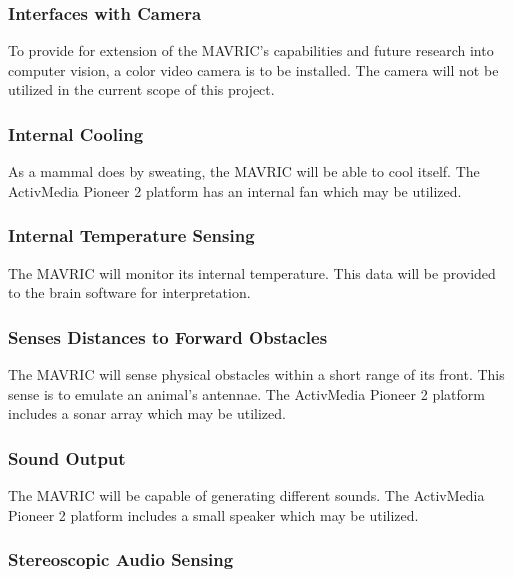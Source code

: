 \documentclass{article}
\begin{document}
        \subsubsection{Interfaces with Camera}
        
            To provide for extension of the MAVRIC's capabilities
            and future research into computer vision,
            a color video camera is to be installed.
            The camera will not be utilized in the current scope of this project.

        \subsubsection{Internal Cooling}
        
            As a mammal does by sweating,
            the MAVRIC will be able to cool itself.
            The ActivMedia Pioneer 2 platform has an internal fan
            which may be utilized.

        \subsubsection{Internal Temperature Sensing}
        
            The MAVRIC will monitor its internal temperature.
            This data will be provided to the brain software
            for interpretation.

        \subsubsection{Senses Distances to Forward Obstacles}
        
            The MAVRIC will sense physical obstacles
            within a short range of its front.
            This sense is to emulate an animal's antennae.
            The ActivMedia Pioneer 2 platform includes a sonar array
            which may be utilized.

        \subsubsection{Sound Output}
        
            The MAVRIC will be capable of generating different sounds.
            The ActivMedia Pioneer 2 platform includes a small speaker
            which may be utilized.

        \subsubsection{Stereoscopic Audio Sensing}
        
\end{document}
